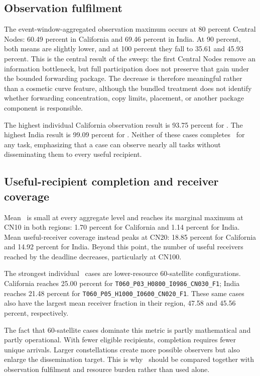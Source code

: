 \subsection{Observation fulfilment}

The event-window-aggregated observation maximum occurs at 80 percent Central Nodes: 60.49 percent in California and 69.46 percent in India. At 90 percent, both means are slightly lower, and at 100 percent they fall to 35.61 and 45.93 percent. This is the central result of the sweep: the first Central Nodes remove an information bottleneck, but full participation does not preserve that gain under the bounded forwarding package. The decrease is therefore meaningful rather than a cosmetic curve feature, although the bundled treatment does not identify whether forwarding concentration, copy limits, placement, or another package component is responsible.

The highest individual California observation result is 93.75 percent for . The highest India result is 99.09 percent for . Neither of these cases completes \Suseful\ for any task, emphasizing that a case can observe nearly all tasks without disseminating them to every useful recipient.

\subsection{Useful-recipient completion and receiver coverage}

Mean \Suseful\ is small at every aggregate level and reaches its marginal maximum at CN10 in both regions: 1.70 percent for California and 1.14 percent for India. Mean useful-receiver coverage instead peaks at CN20: 18.85 percent for California and 14.92 percent for India. Beyond this point, the number of useful receivers reached by the deadline decreases, particularly at CN100.

The strongest individual \Suseful\ cases are lower-resource 60-satellite configurations. California reaches 25.00 percent for \texttt{T060\_P03\_H0800\_I0986\_CN030\_F1}; India reaches 21.48 percent for \texttt{T060\_P05\_H1000\_I0600\_CN020\_F1}. These same cases also have the largest mean receiver fraction in their region, 47.58 and 45.56 percent, respectively.

The fact that 60-satellite cases dominate this metric is partly mathematical and partly operational. With fewer eligible recipients, completion requires fewer unique arrivals. Larger constellations create more possible observers but also enlarge the dissemination target. This is why \Suseful\ should be compared together with observation fulfilment and resource burden rather than used alone.

